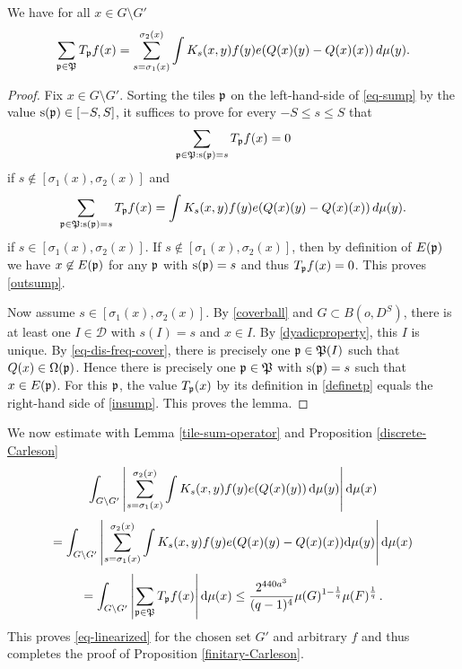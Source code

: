 \begin{lemma}
\label{tile-sum-operator}
We have for all $x\in G\setminus G'$
\begin{equation}\label{eq-sump}
    \sum_{{\mathfrak p}\in {\mathfrak P}}T_{{\mathfrak p}} f(x)= \sum_{s=\sigma_1(x)}^{\sigma_2(x)}
    \int   K_{s}(x,y) f(y) e({Q}(x)(y)-{Q}(x)(x))\, d\mu(y).
\end{equation}
\end{lemma}
\begin{proof}
Fix $x\in G\setminus G'$.
Sorting the tiles ${\mathfrak p}$ on the left-hand-side of \eqref{eq-sump} by the value ${\mathrm{s}}({\mathfrak p})\in [-S,S]$,
it suffices to prove  for every $-S\le s\le S$ that
\begin{equation}\label{outsump}
    \sum_{{\mathfrak p}\in {\mathfrak P}: {\mathrm{s}}({\mathfrak p})=s}T_{{\mathfrak p}} f(x)=0
\end{equation}
 if $s\not\in [\sigma_1(x), \sigma_2(x)]$ and
\begin{equation}\label{insump}
    \sum_{{\mathfrak p}\in {\mathfrak P}: {\mathrm{s}}({\mathfrak p})=s}T_{{\mathfrak p}} f(x)=
    \int   K_{s}(x,y) f(y) e({Q}(x)(y) - {Q}(x)(x))\, d\mu(y).
\end{equation}
if $s\in [\sigma_1(x),\sigma_2(x)]$.
If $s\not\in [\sigma_1(x), \sigma_2(x)]$, then by definition of $E({\mathfrak p})$ we have
$x\not\in E({\mathfrak p})$ for any ${\mathfrak p}$ with ${\mathrm{s}}({\mathfrak p})=s$ and thus $T_{{\mathfrak p}} f(x)=0$. This proves
\eqref{outsump}.

Now assume $s\in [\sigma_1(x),\sigma_2(x)]$.
By \eqref{coverball} and $G\subset B(o,D^S)$, there is at least
one $I\in \mathcal{D}$ with $s(I)=s$ and $x\in I$.
By \eqref{dyadicproperty}, this $I$ is unique. By \eqref{eq-dis-freq-cover}, there is precisely one ${\mathfrak p}\in {\mathfrak P}(I)$ such that
${Q}(x)\in {\Omega}({\mathfrak p})$. Hence there is precisely one  ${\mathfrak p}\in {\mathfrak P}$ with  ${\mathrm{s}}({\mathfrak p})=s$ such that
$x\in E({\mathfrak p})$. For this ${\mathfrak p}$, the value $T_{{\mathfrak p}}(x)$ by its definition in \eqref{definetp}
equals the right-hand side of \eqref{insump}. This proves the lemma.
\end{proof}

We now estimate with Lemma \ref{tile-sum-operator} and Proposition \ref{discrete-Carleson}
\begin{equation}
 \int_{G \setminus G'} \left|\sum_{s={\sigma_1}(x)}^{{\sigma_2}(x)} \int K_s(x,y) f(y) e({Q}(x)(y))  \, \mathrm{d}\mu(y)\right| \mathrm{d}\mu(x)
\end{equation}
\begin{equation}
 =\int_{G \setminus G'} \left|\sum_{s={\sigma_1}(x)}^{{\sigma_2}(x)} \int K_s(x,y) f(y) e({Q}(x)(y) - {Q}(x)(x))\mathrm{d}\mu(y)\right| \mathrm{d}\mu(x)
\end{equation}
\begin{equation}
 =\int_{G \setminus G'} \left|\sum_{{\mathfrak p}\in {\mathfrak P}}T_{{\mathfrak p}} f(x)\right| \mathrm{d}\mu(x)
 \le \frac{2^{440a^3}}{(q-1)^4} \mu(G)^{1 -  \frac{1}{q}} \mu(F)^{\frac{1}{q}} \,.
\end{equation}
This proves \eqref{eq-linearized} for the chosen set $G'$ and arbitrary $f$ and thus completes the proof of Proposition
\ref{finitary-Carleson}.



